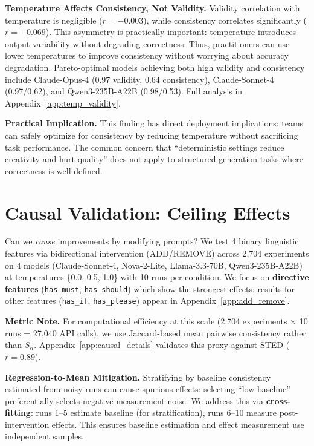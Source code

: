 \documentclass[sigconf,anonymous,review]{acmart}
\begin{document}
\textbf{Temperature Affects Consistency, Not Validity.} Validity correlation with temperature is negligible ($r = -0.003$), while consistency correlates significantly ($r = -0.069$). This asymmetry is practically important: temperature introduces output variability without degrading correctness. Thus, practitioners can use lower temperatures to improve consistency without worrying about accuracy degradation. Pareto-optimal models achieving both high validity and consistency include Claude-Opus-4 (0.97 validity, 0.64 consistency), Claude-Sonnet-4 (0.97/0.62), and Qwen3-235B-A22B (0.98/0.53). Full analysis in Appendix~\ref{app:temp_validity}.

\textbf{Practical Implication.} This finding has direct deployment implications: teams can safely optimize for consistency by reducing temperature without sacrificing task performance. The common concern that ``deterministic settings reduce creativity and hurt quality'' does not apply to structured generation tasks where correctness is well-defined.

\section{Causal Validation: Ceiling Effects}
\label{sec:causal}

Can we \textit{cause} improvements by modifying prompts? We test 4 binary linguistic features via bidirectional intervention (ADD/REMOVE) across 2,704 experiments on 4 models (Claude-Sonnet-4, Nova-2-Lite, Llama-3.3-70B, Qwen3-235B-A22B) at temperatures \{0.0, 0.5, 1.0\} with 10 runs per condition. We focus on \textbf{directive features} (\texttt{has\_must}, \texttt{has\_should}) which show the strongest effects; results for other features (\texttt{has\_if}, \texttt{has\_please}) appear in Appendix~\ref{app:add_remove}.

\textbf{Metric Note.} For computational efficiency at this scale (2,704 experiments $\times$ 10 runs = 27,040 API calls), we use Jaccard-based mean pairwise consistency rather than $S_\alpha$. Appendix~\ref{app:causal_details} validates this proxy against STED ($r=0.89$).

\textbf{Regression-to-Mean Mitigation.} Stratifying by baseline consistency estimated from noisy runs can cause spurious effects: selecting ``low baseline'' preferentially selects negative measurement noise. We address this via \textbf{cross-fitting}: runs 1--5 estimate baseline (for stratification), runs 6--10 measure post-intervention effects. This ensures baseline estimation and effect measurement use independent samples.
\end{document}
